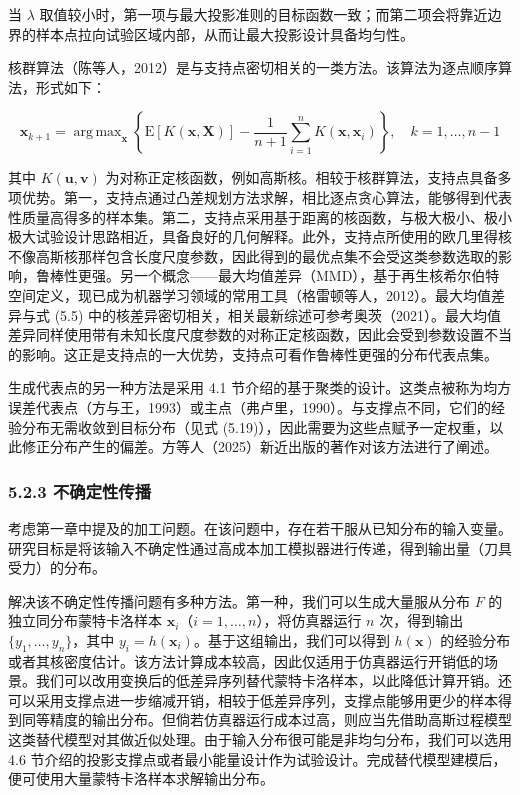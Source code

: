 \documentclass{ctexart}
\DeclareMathOperator*{\argmax}{arg\,max}
\begin{document}
当 $\lambda$ 取值较小时，第一项与最大投影准则的目标函数一致；而第二项会将靠近边界的样本点拉向试验区域内部，从而让最大投影设计具备均匀性。

核群算法（陈等人，2012）是与支持点密切相关的一类方法。该算法为逐点顺序算法，形式如下：

\begin{equation*}
\boldsymbol{x}_{k+1}=\argmax_{\boldsymbol{x}}\left\{\mathrm{E}[K(\boldsymbol{x},\boldsymbol{X})]-\frac{1}{n+1}\sum_{i=1}^{n}K(\boldsymbol{x},\boldsymbol{x}_i)\right\},\quad k=1,\dots,n-1
\end{equation*}

其中 $K(\boldsymbol{u},\boldsymbol{v})$ 为对称正定核函数，例如高斯核。相较于核群算法，支持点具备多项优势。第一，支持点通过凸差规划方法求解，相比逐点贪心算法，能够得到代表性质量高得多的样本集。第二，支持点采用基于距离的核函数，与极大极小、极小极大试验设计思路相近，具备良好的几何解释。此外，支持点所使用的欧几里得核不像高斯核那样包含长度尺度参数，因此得到的最优点集不会受这类参数选取的影响，鲁棒性更强。另一个概念——最大均值差异（MMD），基于再生核希尔伯特空间定义，现已成为机器学习领域的常用工具（格雷顿等人，2012）。最大均值差异与式 (5.5) 中的核差异密切相关，相关最新综述可参考奥茨（2021）。最大均值差异同样使用带有未知长度尺度参数的对称正定核函数，因此会受到参数设置不当的影响。这正是支持点的一大优势，支持点可看作鲁棒性更强的分布代表点集。

生成代表点的另一种方法是采用 4.1 节介绍的基于聚类的设计。这类点被称为均方误差代表点（方与王，1993）或主点（弗卢里，1990）。与支撑点不同，它们的经验分布无需收敛到目标分布（见式 (5.19)），因此需要为这些点赋予一定权重，以此修正分布产生的偏差。方等人（2025）新近出版的著作对该方法进行了阐述。

\subsubsection*{5.2.3 不确定性传播}

考虑第一章中提及的加工问题。在该问题中，存在若干服从已知分布的输入变量。研究目标是将该输入不确定性通过高成本加工模拟器进行传递，得到输出量（刀具受力）的分布。

解决该不确定性传播问题有多种方法。第一种，我们可以生成大量服从分布 $F$ 的独立同分布蒙特卡洛样本 $\boldsymbol{x}_i$（$i=1,\dots,n$），将仿真器运行 $n$ 次，得到输出 $\{y_1,\dots,y_n\}$，其中 $y_i=h(\boldsymbol{x}_i)$。基于这组输出，我们可以得到 $h(\boldsymbol{x})$ 的经验分布或者其核密度估计。该方法计算成本较高，因此仅适用于仿真器运行开销低的场景。我们可以改用变换后的低差异序列替代蒙特卡洛样本，以此降低计算开销。还可以采用支撑点进一步缩减开销，相较于低差异序列，支撑点能够用更少的样本得到同等精度的输出分布。但倘若仿真器运行成本过高，则应当先借助高斯过程模型这类替代模型对其做近似处理。由于输入分布很可能是非均匀分布，我们可以选用 4.6 节介绍的投影支撑点或者最小能量设计作为试验设计。完成替代模型建模后，便可使用大量蒙特卡洛样本求解输出分布。
\end{document}
